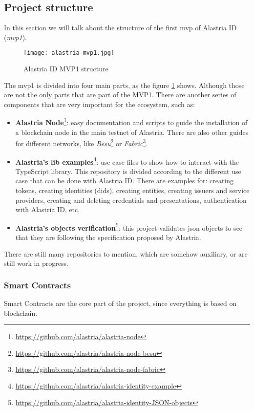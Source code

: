  \subsection{Project structure}
        In this section we will talk about the structure of the first \acrlong{mvp} of Alastria ID (\textit{\acrshort{mvp}1})\cite{ala-mvp1}.\\
        \begin{figure}[h]
            \centering
            \texttt{[image: alastria-mvp1.jpg]}
            \caption{Alastria ID MVP1 structure}
            \label{fig:ala_structure}
        \end{figure}
        The \acrshort{mvp}1 is divided into four main parts, as the figure \ref{fig:ala_structure} shows. Although those are not the only parts that are part of the MVP1. There are another series of components that are very important for the ecosystem, such as:
        \begin{itemize}
            \item \textbf{Alastria Node}\footnote{\url{https://github.com/alastria/alastria-node}}: easy documentation and scripts to guide the installation of a blockchain node in the main testnet of Alastria. There are also other guides for different networks, like \textit{Besu}\footnote{\url{https://github.com/alastria/alastria-node-besu}} or \textit{Fabric}\footnote{\url{https://github.com/alastria/alastria-node-fabric}}.
            \item \textbf{Alastria's lib examples}\footnote{\url{https://github.com/alastria/alastria-identity-example}}: use case files to show how to interact with the TypeScript library. This repository is divided according to the different use case that can be done with Alastria ID. There are examples for: creating tokens, creating identities (\acrshort{did}s), creating entities, creating issuers and service providers, creating and deleting credentials and presentations, authentication with Alastria ID, etc.
            \item \textbf{Alastria's objects verification}\footnote{\url{https://github.com/alastria/alastria-identity-JSON-objects}}: this project validates \acrshort{json} objects to see that they are following the specification proposed by Alastria.
        \end{itemize}
        There are still many repositories to mention, which are somehow auxiliary, or are still work in progress.
        
        \subsubsection{Smart Contracts}
            Smart Contracts are the core part of the project, since everything is based on blockchain.\\
            
